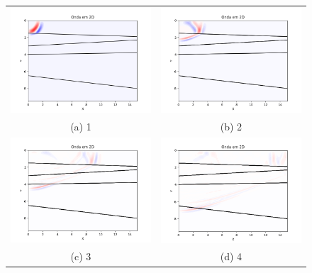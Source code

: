                 \begin{figure}[H]
                    \begin{tabular}{cc} \includegraphics[width=65mm]{imagens/FDMimages/Teste00.png} &  \includegraphics[width=65mm]{imagens/FDMimages/Teste01.png} \\
                    (a) 1 & (b) 2 \\
                    [6pt] \includegraphics[width=65mm]{imagens/FDMimages/Teste05.png} & \includegraphics[width=65mm]{imagens/FDMimages/Teste010.png} \\
                    (c) 3 & (d) 4 \\

\end{tabular}
\end{figure}
